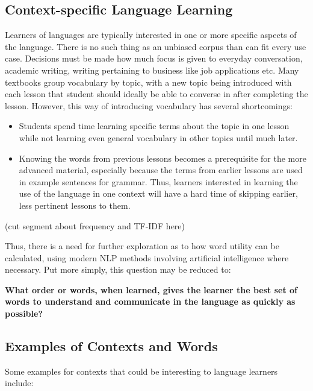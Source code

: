 
\subsection{Context-specific Language Learning}

Learners of languages are typically interested in one or more specific aspects of the language.
There is no such thing as an unbiased corpus than can fit every use case.
Decisions must be made how much focus is given to everyday conversation, academic writing, writing pertaining to business like job applications etc.
Many textbooks group vocabulary by topic, with a new topic being introduced with each lesson that student should ideally be able to converse in after completing the lesson.
However, this way of introducing vocabulary has several shortcomings:
\begin{itemize}
	\item Students spend time learning specific terms about the topic in one lesson while not learning even general vocabulary in other topics until much later.
	\item Knowing the words from previous lessons becomes a prerequisite for the more advanced material, especially because the terms from earlier lessons are used in example sentences for grammar.
	      Thus, learners interested in learning the use of the language in one context will have a hard time of skipping earlier, less pertinent lessons to them.
\end{itemize}


(cut segment about frequency and TF-IDF here)

Thus, there is a need for further exploration as to how word utility can be calculated, using modern NLP methods involving artificial intelligence where necessary.
Put more simply, this question may be reduced to:

\textbf{What order or words, when learned, gives the learner the best set of words to understand and communicate in the language as quickly as possible?}

\subsection{Examples of Contexts and Words}
Some examples for contexts that could be interesting to language learners include:

